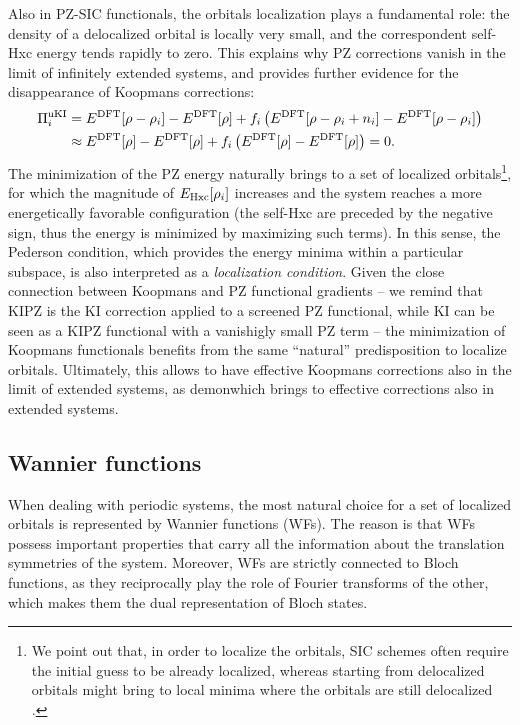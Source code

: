 Also in PZ-SIC functionals, the orbitals localization plays a fundamental role: the density of a delocalized orbital is locally very small, and the correspondent self-Hxc energy tends rapidly to zero. This explains why PZ corrections vanish in the limit of infinitely extended systems, and provides further evidence for the disappearance of Koopmans corrections:
%
\begin{equation}
    \begin{split}
    \Pi_i^{\rm uKI} &= E^{\rm DFT}[\rho - \rho_i] - E^{\rm DFT}[\rho] + f_i \left( E^{\rm DFT}[\rho - \rho_i + n_i] - E^{\rm DFT}[\rho - \rho_i] \right) \\
    &\approx E^{\rm DFT}[\rho] - E^{\rm DFT}[\rho] + f_i \left( E^{\rm DFT}[\rho] - E^{\rm DFT}[\rho] \right) = 0 .
    \end{split}
    \label{eq:vanishing-ki-correction}
\end{equation}
%
The minimization of the PZ energy naturally brings to a set of localized orbitals\footnote{We point out that, in order to localize the orbitals, SIC schemes often require the initial guess to be already localized, whereas starting from delocalized orbitals might bring to local minima where the orbitals are still delocalized \cite{korzdorfer_relation_2011}.}, for which the magnitude of $E_{\rm Hxc}[\rho_i]$ increases and the system reaches a more energetically favorable configuration (the self-Hxc are preceded by the negative sign, thus the energy is minimized by maximizing such terms). In this sense, the Pederson condition, which provides the energy minima within a particular subspace, is also interpreted as a \emph{localization condition}. Given the close connection between Koopmans and PZ functional gradients -- we remind that KIPZ is the KI correction applied to a screened PZ functional, while KI can be seen as a KIPZ functional with a vanishigly small PZ term -- the minimization of Koopmans functionals benefits from the same ``natural'' predisposition to localize orbitals. Ultimately, this allows to have effective Koopmans corrections also in the limit of extended systems, as demonwhich brings to effective corrections also in extended systems. 

\subsection{Wannier functions\label{sec:wannier-functions}}
When dealing with periodic systems, the most natural choice for a set of localized orbitals is represented by Wannier functions (WFs). The reason is that WFs possess important properties that carry all the information about the translation symmetries of the system. Moreover, WFs are strictly connected to Bloch functions, as they reciprocally play the role of Fourier transforms of the other, which makes them the dual representation of Bloch states.

